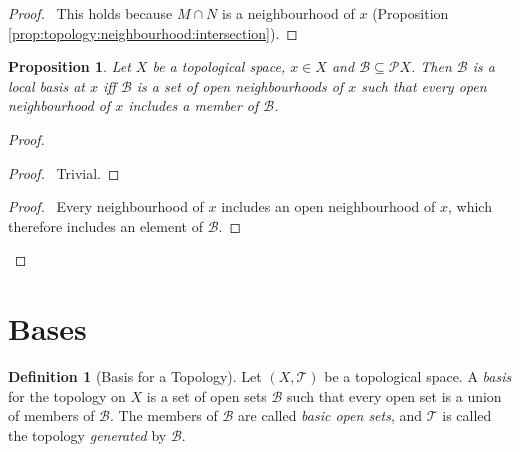 \documentclass{report}
\let\qed\relax
\newtheorem{prop}[lm]{Proposition}
\theoremstyle{definition}
\newtheorem{df}[lm]{Definition}
\begin{document}
  \begin{proof}
    \pf\ This holds because $M \cap N$ is a neighbourhood of $x$ (Proposition
    \ref{prop:topology:neighbourhood:intersection}). \qed
  \end{proof}

  \begin{prop}
    \label{prop:topology:local_basis:characterisation}
    Let $X$ be a topological space, $x \in X$ and $\mathcal{B} \subseteq
    \mathcal{P} X$. Then $\mathcal{B}$ is a local basis at $x$ iff
    $\mathcal{B}$ is a set of open neighbourhoods of $x$ such that every open
    neighbourhood of $x$ includes a member of $\mathcal{B}$.
  \end{prop}

  \begin{proof}
    \pf
    \begin{proof}
      \pf\ Trivial.
    \end{proof}
    \begin{proof}
      \pf\ Every neighbourhood of $x$ includes an open neighbourhood of $x$,
      which therefore includes an element of $\mathcal{B}$.
    \end{proof}
    \qed
  \end{proof}

  \section{Bases}

  \begin{df}[Basis for a Topology]
    Let $(X, \mathcal{T})$ be a topological space. A \emph{basis} for the
    topology on $X$ is a
    set of open sets $\mathcal{B}$ such that every open set is a union of
    members of $\mathcal{B}$. The members of $\mathcal{B}$ are called
    \emph{basic open sets}, and $\mathcal{T}$ is called the topology
    \emph{generated} by $\mathcal{B}$.
  \end{df}
\end{document}

